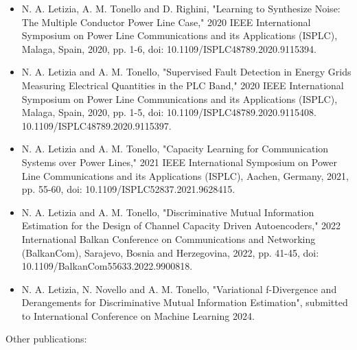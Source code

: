 \begin{itemize}
	\item N. A. Letizia, A. M. Tonello and D. Righini, "Learning to Synthesize Noise: The Multiple Conductor Power Line Case," 2020 IEEE International Symposium on Power Line Communications and its Applications (ISPLC), Malaga, Spain, 2020, pp. 1-6, doi: 10.1109/ISPLC48789.2020.9115394.
	\item N. A. Letizia and A. M. Tonello, "Supervised Fault Detection in Energy Grids Measuring Electrical Quantities in the PLC Band," 2020 IEEE International Symposium on Power Line Communications and its Applications (ISPLC), Malaga, Spain, 2020, pp. 1-5, doi: 10.1109/ISPLC48789.2020.9115408.
	 10.1109/ISPLC48789.2020.9115397.
        \item N. A. Letizia and A. M. Tonello, "Capacity Learning for Communication Systems over Power Lines," 2021 IEEE International Symposium on Power Line Communications and its Applications (ISPLC), Aachen, Germany, 2021, pp. 55-60, doi: 10.1109/ISPLC52837.2021.9628415.
        \item N. A. Letizia and A. M. Tonello, "Discriminative Mutual Information Estimation for the Design of Channel Capacity Driven Autoencoders," 2022 International Balkan Conference on Communications and Networking (BalkanCom), Sarajevo, Bosnia and Herzegovina, 2022, pp. 41-45, doi: 10.1109/BalkanCom55633.2022.9900818.
        \item N. A. Letizia, N. Novello and A. M. Tonello, "Variational f-Divergence and Derangements for Discriminative Mutual Information Estimation", submitted to International Conference on Machine Learning 2024.
\end{itemize}
Other publications:
